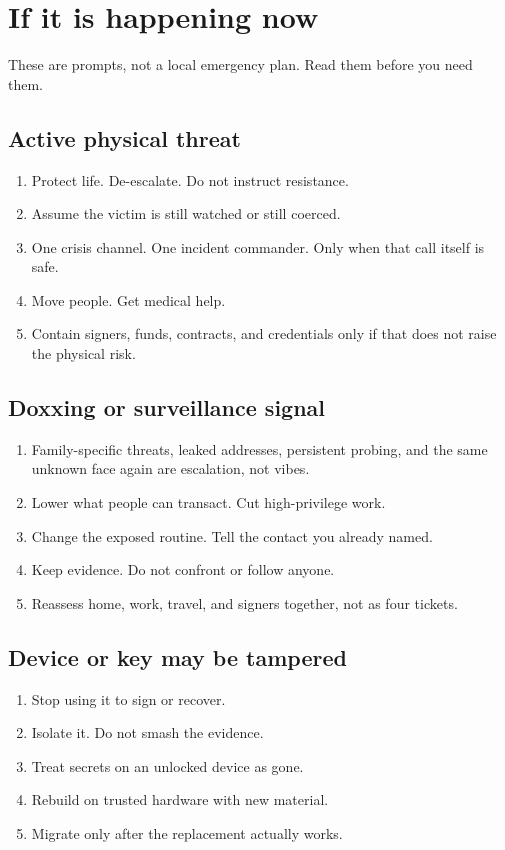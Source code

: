 \chapter{If it is happening now}

These are prompts, not a local emergency plan. Read them
before you need them.

\section{Active physical threat}

\begin{enumerate}
  \item Protect life. De-escalate. Do not instruct
  resistance.
  \item Assume the victim is still watched or still
  coerced.
  \item One crisis channel. One incident commander. Only
  when that call itself is safe.
  \item Move people. Get medical help.
  \item Contain signers, funds, contracts, and
  credentials only if that does not raise the physical
  risk.
\end{enumerate}

\section{Doxxing or surveillance signal}

\begin{enumerate}
  \item Family-specific threats, leaked addresses,
  persistent probing, and the same unknown face again
  are escalation, not vibes.
  \item Lower what people can transact. Cut
  high-privilege work.
  \item Change the exposed routine. Tell the contact you
  already named.
  \item Keep evidence. Do not confront or follow anyone.
  \item Reassess home, work, travel, and signers
  together, not as four tickets.
\end{enumerate}

\section{Device or key may be tampered}

\begin{enumerate}
  \item Stop using it to sign or recover.
  \item Isolate it. Do not smash the evidence.
  \item Treat secrets on an unlocked device as gone.
  \item Rebuild on trusted hardware with new material.
  \item Migrate only after the replacement actually
  works.
\end{enumerate}

